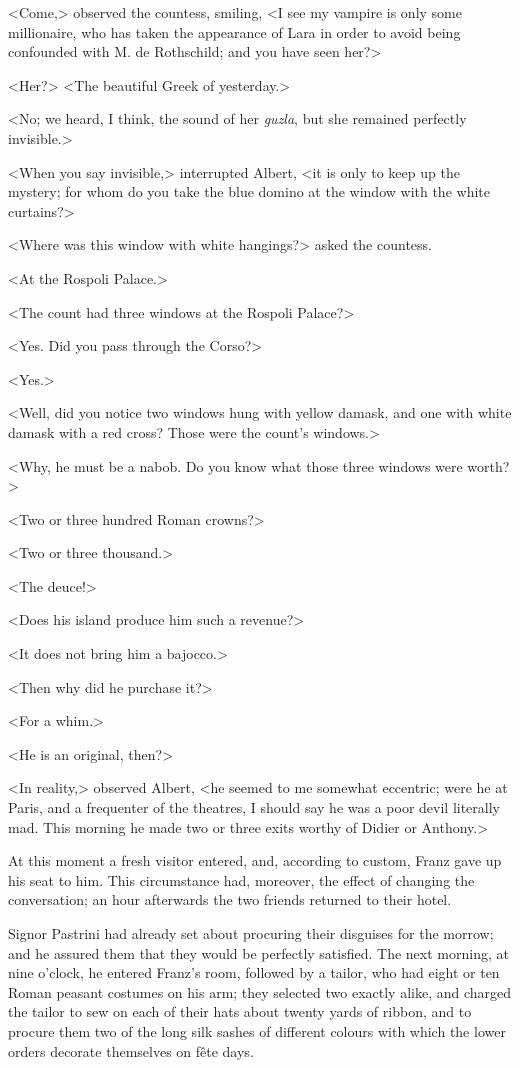  <Come,> observed the countess, smiling, <I see my vampire is only some millionaire, who has taken the appearance of Lara in order to avoid being confounded with M. de Rothschild; and you have seen her?> 

 <Her?>  <The beautiful Greek of yesterday.> 

 <No; we heard, I think, the sound of her \textit{guzla}, but she remained perfectly invisible.> 

 <When you say invisible,> interrupted Albert, <it is only to keep up the mystery; for whom do you take the blue domino at the window with the white curtains?> 

 <Where was this window with white hangings?> asked the countess. 

 <At the Rospoli Palace.> 

 <The count had three windows at the Rospoli Palace?> 

 <Yes. Did you pass through the Corso?> 

 <Yes.> 

 <Well, did you notice two windows hung with yellow damask, and one with white damask with a red cross? Those were the count's windows.> 

 <Why, he must be a nabob. Do you know what those three windows were worth?> 

 <Two or three hundred Roman crowns?> 

 <Two or three thousand.> 

 <The deuce!> 

 <Does his island produce him such a revenue?> 

 <It does not bring him a bajocco.> 

 <Then why did he purchase it?> 

 <For a whim.> 

 <He is an original, then?> 

 <In reality,> observed Albert, <he seemed to me somewhat eccentric; were he at Paris, and a frequenter of the theatres, I should say he was a poor devil literally mad. This morning he made two or three exits worthy of Didier or Anthony.> 

 At this moment a fresh visitor entered, and, according to custom, Franz gave up his seat to him. This circumstance had, moreover, the effect of changing the conversation; an hour afterwards the two friends returned to their hotel. 

 Signor Pastrini had already set about procuring their disguises for the morrow; and he assured them that they would be perfectly satisfied. The next morning, at nine o'clock, he entered Franz's room, followed by a tailor, who had eight or ten Roman peasant costumes on his arm; they selected two exactly alike, and charged the tailor to sew on each of their hats about twenty yards of ribbon, and to procure them two of the long silk sashes of different colours with which the lower orders decorate themselves on fête days. 

